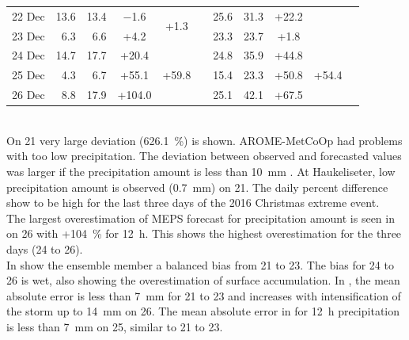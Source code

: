 \begin{table}[!t]
\begin{center}
\begin{tabular}{c||r|r|c|c|c||r|r|c|c|c}
			\num{22} Dec & \num{13.6} & \num{13.4} & \num{-1.6} & \multirow{2}{*}{+\num{1.3}} & & \num{25.6} & \num{31.3} & +\num{22.2} &  &  \\\cline{1-4}\cline{7-9}
			\num{23} Dec & \num{6.3} & \num{6.6} & +\num{4.2} & & & \num{23.3} & \num{23.7} & +\num{1.8} &  &  \\\cline{1-5}\cline{7-10}
			\num{24} Dec & \num{14.7} & \num{17.7} & +\num{20.4} & \multirow{3}{*}{+\num{59.8}} & & \num{24.8} & \num{35.9} & +\num{44.8} & \multirow{3}{*}{+\num{54.4}}  &  \\\cline{1-4}\cline{7-9}
			\num{25} Dec & \num{4.3} & \num{6.7} & +\num{55.1} & & & \num{15.4} & \num{23.3} & +\num{50.8} & &   \\\cline{1-4}\cline{7-9}
			\num{26} Dec & \num{8.8} & \num{17.9} & +\num{104.0} & & & \num{25.1} & \num{42.1} & +\num{67.5} &  &  \\\hline\hline
		\end{tabular}
	\end{center}
\end{table}
\noindent
\\
On \SI{21}{\dec} very large deviation (\SI{626.1}{\percent}) is shown. 
AROME-MetCoOp had problems with too low precipitation. The deviation between observed and forecasted values was larger if the precipitation amount is less than \SI{10}{\mm} \citep{muller_arome-metcoop:_2017}. At Haukeliseter, low precipitation amount is observed (\SI{0.7}{\mm}) on \SI{21}{\dec}.
The daily percent difference show to be high for the last three days of the 2016 Christmas extreme event.  
\\
The largest overestimation of MEPS forecast for precipitation amount is seen in  on \SI{26}{\dec} with +\SI{104}{\percent} for \SI{12}{\hour}. This shows the highest overestimation for the three days (\num{24} to \SI{26}{\dec}).
\\
In  show the ensemble member a balanced bias from \num{21} to \SI{23}{\dec}. The bias for \num{24} to \SI{26}{\dec} is wet, also showing the overestimation of surface accumulation.
In , the mean absolute error is less than \SI{7}{\mm} for \num{21} to \SI{23}{\dec} and increases with intensification of the storm up to \SI{14}{\mm} on \SI{26}{\dec}. The mean absolute error in  for \SI{12}{\hour} precipitation is less than \SI{7}{\mm} on \SI{25}{\dec}, similar to \num{21} to \SI{23}{\dec}.
